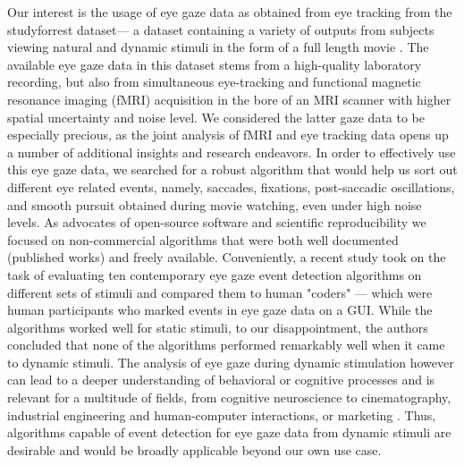 Our interest is the usage of eye gaze data as obtained from eye tracking from the studyforrest dataset--- a dataset containing a variety of outputs from subjects viewing natural and dynamic stimuli in the form of a full length movie \citep{Hanke2016}. The available eye gaze data in this dataset stems from a high-quality laboratory recording, but also from simultaneous eye-tracking and functional magnetic resonance imaging (fMRI) acquisition in the bore of an MRI scanner with higher spatial uncertainty and noise level. We considered the latter gaze data to be especially precious, as the joint analysis of fMRI and eye tracking data opens up a number of additional insights and research endeavors.  In order to effectively use this eye gaze data, we searched for a robust algorithm that would help us sort out different eye related events, namely, saccades, fixations, post-saccadic oscillations, and smooth pursuit obtained during movie watching, even under high noise levels. As advocates of open-source software and scientific reproducibility we focused on non-commercial algorithms that were both well documented (published works) and freely available. Conveniently, a recent study \citep{Andersson2017} took on the task of evaluating ten contemporary eye gaze event detection algorithms on different sets of stimuli and compared them to human "coders" --- which were human participants who marked events in eye gaze data on a GUI. While the algorithms worked well for static stimuli, to our disappointment, the authors concluded that none of the algorithms performed remarkably well when it came to dynamic stimuli. The analysis of eye gaze during dynamic stimulation however can lead to a deeper understanding of behavioral or cognitive processes and is relevant for a multitude of fields, from cognitive neuroscience to cinematography, industrial engineering and human-computer interactions, or marketing \citep{Duchowski2002}. Thus, algorithms capable of event detection for eye gaze data from dynamic stimuli are desirable and would be broadly applicable beyond our own use case. \\

